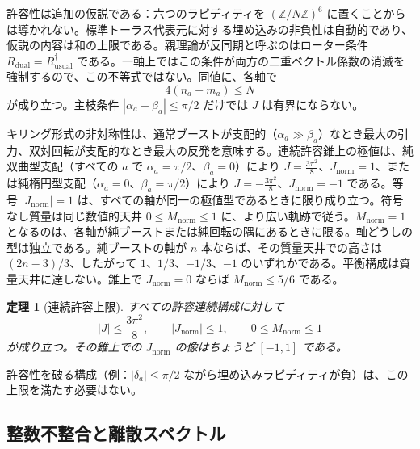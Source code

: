 \documentclass[a4paper]{article}
\newtheorem{theorem}{定理}[section]
\theoremstyle{definition}
\newcommand{\Jnorm}{J_{\mathrm{norm}}}
\newcommand{\Jbound}{\frac{3\pi^2}{8}}
\newcommand{\Mnorm}{M_{\mathrm{norm}}}
\begin{document}
許容性は追加の仮説である：六つのラピディティを $(\mathbb{Z}/N\mathbb{Z})^6$ に置くことからは導かれない。標準トーラス代表元に対する埋め込みの非負性は自動的であり、仮説の内容は和の上限である。親理論が反同期と呼ぶのはローター条件 $R_{\mathrm{dual}}=R_{\mathrm{usual}}^\dagger$ である。一軸上ではこの条件が両方の二重ベクトル係数の消滅を強制するので、この不等式ではない。同値に、各軸で
\begin{equation}
\label{eq:four-le}
4(n_a+m_a)\leq N
\end{equation}
が成り立つ。主枝条件 $|\alpha_a+\beta_a|\le\pi/2$ だけでは $J$ は有界にならない。

キリング形式の非対称性は、通常ブーストが支配的（$\alpha_a \gg \beta_a$）なとき最大の引力、双対回転が支配的なとき最大の反発を意味する。連続許容錐上の極値は、純双曲型支配（すべての $a$ で $\alpha_a=\pi/2$、$\beta_a=0$）により $J=\Jbound$、$\Jnorm=1$、または純楕円型支配（$\alpha_a=0$、$\beta_a=\pi/2$）により $J=-\Jbound$、$\Jnorm=-1$ である。等号 $|\Jnorm|=1$ は、すべての軸が同一の極値型であるときに限り成り立つ。符号なし質量は同じ数値的天井 $0\leq\Mnorm\leq 1$ に、より広い軌跡で従う。$\Mnorm=1$ となるのは、各軸が純ブーストまたは純回転の隅にあるときに限る。軸どうしの型は独立である。純ブーストの軸が $n$ 本ならば、その質量天井での高さは $(2n-3)/3$、したがって $1$、$1/3$、$-1/3$、$-1$ のいずれかである。平衡構成は質量天井に達しない。錐上で $\Jnorm=0$ ならば $\Mnorm\leq 5/6$ である。

\begin{theorem}[連続許容上限]
\label{thm:continuous-bound}
すべての許容連続構成に対して
\[
|J| \leq \Jbound, \qquad |\Jnorm| \leq 1, \qquad 0\leq \Mnorm\leq 1
\]
が成り立つ。その錐上での $\Jnorm$ の像はちょうど $[-1,1]$ である。
\end{theorem}

許容性を破る構成（例：$|\delta_a|\leq\pi/2$ ながら埋め込みラピディティが負）は、この上限を満たす必要はない。

\subsection{整数不整合と離散スペクトル}
\end{document}
